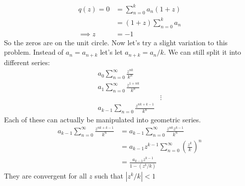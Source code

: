 \documentclass{article}
\begin{document}
\begin{enumerate}
\begin{align*}
        q(z)=0&=\sum_{n=0}^k a_n(1+z)\\
        &=(1+z)\sum_{n=0}^k a_n\\
        \implies z&=-1
      \end{align*}
      So the zeros are on the unit circle. Now let's try a slight variation to this problem. Instead of $a_n=a_{n+k}$ let's let $a_{n+k}=a_n/k$. We can still split it into different series:
      \begin{align*}
        a_0\sum_{n=0}^\infty \frac{z^{nk}}{k^n}\\
        a_1\sum_{n=0}^\infty \frac{z^{1+nk}}{k^n}\\
        &\vdots\\
        a_{k-1}\sum_{n=0}\frac{z^{nk+k-1}}{k^n}
      \end{align*}
      Each of these can actually be manipulated into geometric series.
      \begin{align*}
        a_{k-1}\sum_{n=0}^\infty\frac{z^{nk+k-1}}{k^n}&=a_{k-1}\sum_{n=0}^\infty\frac{z^{nk}z^{k-1}}{k^n}\\
        &=a_{k-1}z^{k-1}\sum_{n=0}^\infty\left(\frac{z^k}{k}\right)^n\\
        &=\frac{a_{k-1}z^{k-1}}{1-(z^k/k)}
      \end{align*}
      They are convergent for all $z$ such that $|z^k/k|<1$
  \end{enumerate}
\end{document}
